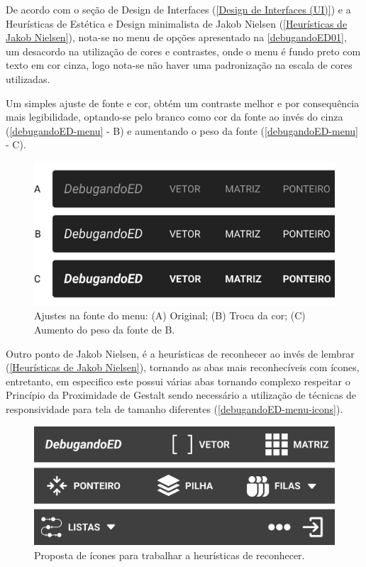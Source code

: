 De acordo com o seção de Design de Interfaces (\autoref{Design de Interfaces (UI)}) e a Heurísticas de Estética e Design minimalista de Jakob Nielsen (\autoref{Heurísticas de Jakob Nielsen}), nota-se no menu de opções apresentado na \autoref{debugandoED01}, um desacordo na utilização de cores e contrastes, onde o menu é fundo preto com texto em cor cinza, logo nota-se não haver uma padronização na escala de cores utilizadas.
    
Um simples ajuste de fonte e cor, obtém um contraste melhor e por consequência mais legibilidade, optando-se pelo branco como cor da fonte ao invés do cinza (\autoref{debugandoED-menu} - B) e aumentando o peso da fonte (\autoref{debugandoED-menu} - C).
    
    \begin{figure}[htb]
        \begin{center}
    	    \includegraphics[scale=1]{figs/debugandoED-menu.png}
    	\end{center}
        \caption{\label{debugandoED-menu}Ajustes na fonte do menu: (A) Original; (B) Troca da cor; (C) Aumento do peso da fonte de B.}
    \end{figure}
    
 Outro ponto de Jakob Nielsen, é a heurísticas de reconhecer ao invés de lembrar (\autoref{Heurísticas de Jakob Nielsen}), tornando as abas mais reconhecíveis com ícones, entretanto, em especifico este possui várias abas tornando complexo respeitar o Princípio da Proximidade de Gestalt sendo necessário a utilização de técnicas de responsividade para tela de tamanho diferentes (\autoref{debugandoED-menu-icons}).
 
\begin{figure}[htb]
    \begin{center}
        \includegraphics[scale=1]{figs/debugandoED-menu-icons.png}
    \end{center}
    \caption{\label{debugandoED-menu-icons}Proposta de ícones para trabalhar a heurísticas de reconhecer.}
\end{figure}

